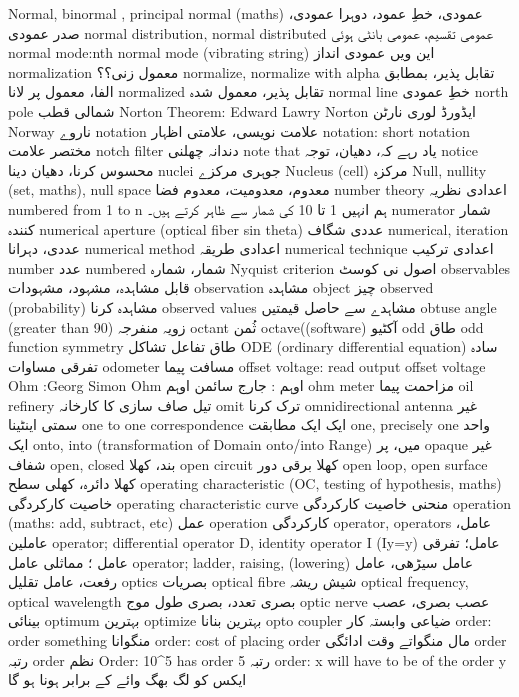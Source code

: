 Normal, binormal , principal normal (maths)	عمودی، خطِ عمود، دوہرا عمودی، صدر عمودی 
normal distribution, normal distributed	عمومی تقسیم، عمومی بانٹی ہوئی
normal mode:nth normal mode (vibrating string)	این ویں عمودی انداز
normalization	معمول زنی؟؟
normalize, normalize with alpha	تقابل پذیر، بمطابق الفا، معمول پر لانا
normalized	تقابل پذیر، معمول شدہ
normal line	خطِ عمودی
north pole	شمالی قطب
Norton Theorem: Edward Lawry Norton	ایڈورڈ لوری نارٹن
Norway	ناروے
notation	علامت نویسی، علامتی اظہار
notation: short notation	مختصر علامت
notch filter	دندانہ چھلنی
note that	یاد رہے کہ، دھیان، توجہ
notice	محسوس کرنا، دھیان دینا
nuclei	جوہری مرکزے
Nucleus (cell)	مرکزہ
Null, nullity (set, maths), null space	معدوم، معدومیت، معدوم فضا
number theory	اعدادی نظریہ
numbered from 1 to n	ہم انہیں 1 تا 10 کی شمار سے ظاہر کرتے ہیں۔
numerator	شمار کنندہ
numerical aperture (optical fiber sin theta)	عددی شگاف
numerical, iteration	عددی، دہرانا
numerical method	اعدادی طریقہ
numerical technique	اعدادی ترکیب
number 	عدد
numbered	شمار، شمارہ
Nyquist criterion	اصول نی کوسٹ
observables	قابل مشاہدہ، مشہود، مشہودات
observation	مشاہدہ
object	چیز
observed (probability)	مشاہدہ کرنا
observed values	مشاہدے سے حاصل قیمتیں
obtuse angle (greater than 90)	زویہ منفرجہ
octant	ثُمن
octave((software)	آکٹیو
odd	طاق
odd function symmetry	طاق تفاعل تشاکل
ODE (ordinary differential equation)	سادہ تفرقی مساوات
odometer	مسافت پیما
offset voltage: read output offset voltage	
Ohm :Georg Simon Ohm	اوہم : جارج سائمن اوہم
ohm meter	مزاحمت پیما
oil refinery	تیل صاف سازی کا کارخانہ
omit	ترک کرنا
omnidirectional antenna	غیر سمتی اینٹینا
one to one correspondence	ایک ایک مطابقت
one, precisely one	واحد ایک
onto, into (transformation of Domain onto/into Range)	میں، پر
opaque	غیر شفاف
open, closed	بند، کھلا
open circuit	کھلا برقی دور
open loop, open surface	کھلا دائرہ، کھلی سطح
operating characteristic (OC, testing of hypothesis, maths)	خاصیت کارکردگی
operating characteristic curve	منحنی خاصیت کارکردگی
operation (maths: add, subtract, etc)	عمل
operation	کارکردگی
operator, operators	عامل، عاملین
operator; differential operator D, identity operator I (Iy=y)	عامل؛ تفرقی عامل ؛ مماثلی عامل
operator; ladder, raising, (lowering)	عامل سیڑھی، عامل رفعت، عامل تقلیل
optics	بصریات
optical fibre	شیش ریشہ
optical frequency, optical wavelength	بصری تعدد، بصری طول موج
optic nerve	عصب بصری، عصب بینائی
optimum	بہترین
optimize	بہترین بنانا
opto coupler	ضیاعی وابستہ کار
order: order something	منگوانا
order: cost of placing order	مال منگواتے وقت ادائگی
order	رتبہ
order	نظم
Order: 10^5 has order 5	رتبہ
order: x will have to be of the order y	ایکس کو لگ بھگ وائے کے برابر ہونا ہو گا
